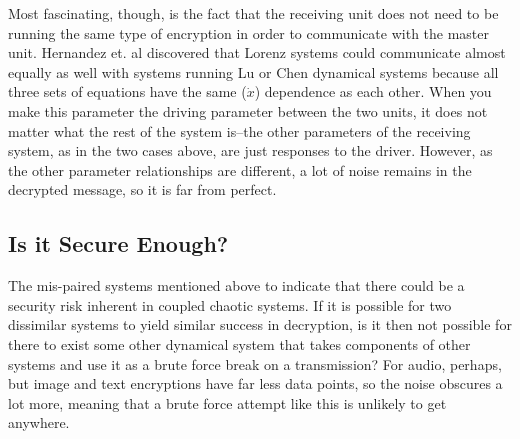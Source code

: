 Most fascinating, though, is the fact that the receiving unit does not need to be running the same type of encryption in order to communicate with the master unit.  Hernandez et. al discovered that Lorenz systems could communicate almost equally as well with systems running Lu or Chen dynamical systems because all three sets of equations have the same ($\dot{x}$) dependence as each other.  When you make this parameter the driving parameter between the two units, it does not matter what the rest of the system is--the other parameters of the receiving system, as in the two cases above, are just responses to the driver.  However, as the other parameter relationships are different, a lot of noise remains in the decrypted message, so it is far from perfect.

\subsection{Is it Secure Enough?}

The mis-paired systems mentioned above to indicate that there could be a security risk inherent in coupled chaotic systems.  If it is possible for two dissimilar systems to yield similar success in decryption, is it then not possible for there to exist some other dynamical system that takes components of other systems and use it as a brute force break on a transmission?  For audio, perhaps, but image and text encryptions have far less data points, so the noise obscures a lot more, meaning that a brute force attempt like this is unlikely to get anywhere.




